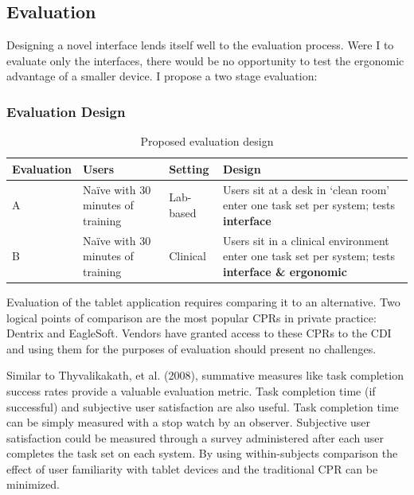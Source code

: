 \documentclass[11pt]{article}
\newcommand{\ra}[1]{\renewcommand{\arraystretch}{#1}}
\begin{document}
\subsection{Evaluation}
\label{eval}

Designing a novel interface lends itself well to the evaluation process. Were I to evaluate only the interfaces, there would be no opportunity to test the ergonomic advantage of a smaller device. I propose a two stage evaluation:
\subsubsection{Evaluation Design}
\reversemarginpar
{}
\begin{table}[h]
	\caption{Proposed evaluation design}
	\begin{center}
	\ra{1.3}
\begin{tabular*}{\textwidth}{p{1.9cm}p{2cm}p{2cm}p{5cm}}  

\toprule
\textbf{Evaluation} & \textbf{Users} & \textbf{Setting} & \textbf{Design} \\
\midrule
A & Na\"{i}ve with 30 minutes of training & Lab-based & Users sit at a desk in `clean room' enter one task set per system; tests \textbf{interface} \\ 
B & Na\"{i}ve with 30 minutes of training & Clinical & Users sit in a clinical environment enter one task set per system; tests \textbf{interface \& ergonomic} \\
\bottomrule
\end{tabular*} \end{center}\end{table}

Evaluation of the tablet application requires comparing it to an alternative. Two logical points of comparison are the most popular CPRs in private practice: Dentrix and EagleSoft. Vendors have granted access to these CPRs to the CDI and using them for the purposes of evaluation should present no challenges.

Similar to Thyvalikakath, et al. (2008), summative measures like task completion success rates provide a valuable evaluation metric. Task completion time (if successful) and subjective user satisfaction are also useful\cite{Chin1998Development-of-}. Task completion time can be simply measured with a stop watch by an observer. Subjective user satisfaction could be measured through a survey administered after each user completes the task set on each system. By using within-subjects comparison the effect of user familiarity with tablet devices and the traditional CPR can be minimized.
\end{document}

